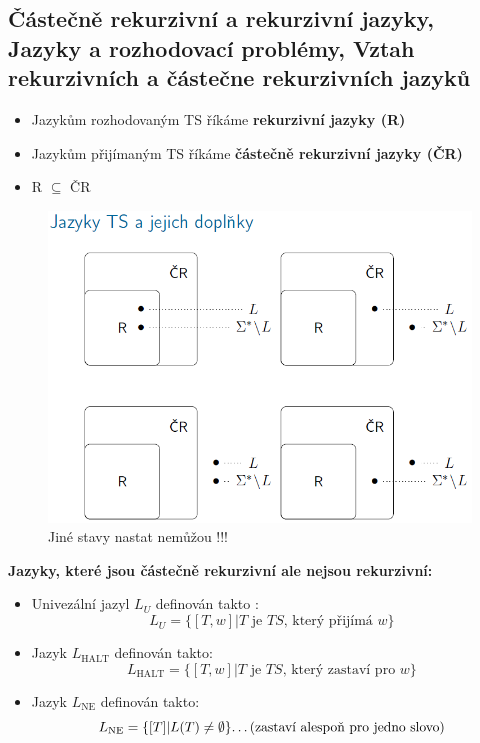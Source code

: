 \documentclass[10pt,a4paper]{article}
\theoremstyle{note}
\begin{document}
	\subsection{Částečně rekurzivní a rekurzivní jazyky, Jazyky a rozhodovací problémy, Vztah rekurzivních a částečne rekurzivních jazyků }

		\begin{itemize}
			\item Jazykům rozhodovaným TS říkáme \textbf{rekurzivní jazyky (R)}
			\item Jazykům přijímaným TS říkáme \textbf{ částečně rekurzivní jazyky (ČR)}
			\item R $\subseteq$ ČR
		\end{itemize}


		\begin{figure}[!h]
		\centering
		\includegraphics[width=12cm]{img/jazykyAJejichDoplnky.png}
		\caption{Jiné stavy nastat nemůžou !!!}
		\end{figure}

		\vspace{1cm}
		\textbf{Jazyky, které jsou částečně rekurzivní ale nejsou rekurzivní:}

		\begin{itemize}
			\item Univezální jazyl $L_{U}$ definován takto : $$L_{U} = \{ [T,w]| T \text{ je } TS \text{, který přijímá } w\}$$
			\item Jazyk $L_{\text{HALT}}$ definován takto:
						$$L_{\text{HALT}} = \{ [T,w]| T \text{ je } TS \text{, který zastaví pro } w\}$$
			\item Jazyk  $L_{\text{NE}}$ definován takto:
					$$L_{\text{NE}} = \{ [ T ] |  L(T)  \neq  \emptyset\} \text{\dots (zastaví alespoň pro jedno slovo)} $$

		\end{itemize}
\end{document}
